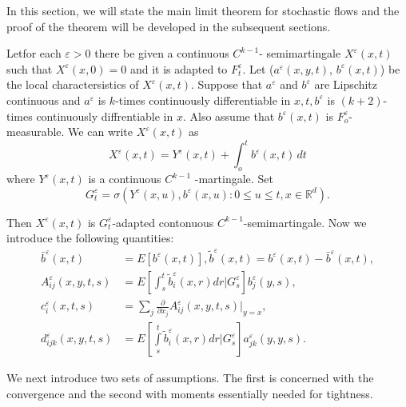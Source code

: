  In this section, we will state the main  limit theorem for stochastic
 flows and the proof of the theorem will be developed in the
 subsequent sections. 
  
 Let\pageoriginale for each $\varepsilon > 0$ there be given a continuous $C^{k-1}$-
 semimartingale $X^\varepsilon(x,t)$ such that $X^\varepsilon (x,0)=0$
 and it is adapted to $F^\varepsilon_t$. Let ($a^\varepsilon
 (x,y,t)$, $b^\varepsilon(x,t)$) be the local charactersistics of
 $X^\varepsilon (x,t)$. Suppose that $a^\varepsilon$ and
 $b^\varepsilon$ are Lipschitz continuous and $a^\varepsilon$ is
 $k$-times continuously differentiable in $x,t,b^\varepsilon$ is
 $(k+2)$- times continuously diffrentiable in $x$. Also assume that
 $b^\varepsilon (x,t)$ is $F^\varepsilon_o$- measurable. We can write
 $X^\varepsilon (x,t)$ as  
 \begin{equation*} 
   X^\varepsilon (x,t) = Y^\varepsilon(x,t) + \int_o^t b^\varepsilon
   (x,t) \, dt \tag{3.3.1}\label{c3:eq3.3.1}  
 \end{equation*} 
 where $Y^\varepsilon (x,t)$ is a continuous $C^{k-1}$ -martingale. Set
 $$
 G^\varepsilon_t= \sigma(Y^\varepsilon(x, u), b^\varepsilon (x,u): 0 
 \le u \le t, x \in \mathbb{R}^d). 
 $$
  
 Then $X^\varepsilon (x,t)$ is $G_t^\varepsilon$-adapted contonuous
 $C^{k-1}$-semimartingale. Now we introduce the following quantities: 
 \begin{align*}
   \bar{b}^\varepsilon (x,t) & = E[b^\varepsilon (x,t)],
   \tilde{b}^\varepsilon (x,t) = b^\varepsilon (x,t) -
   \bar{b}^\varepsilon (x,t),\\ 
   A^\varepsilon_{ij}(x,y,t,s) &= E \left[ \int^t_s \tilde{b}_i^\varepsilon
     (x,r) dr |G^\varepsilon_s \right] b^\varepsilon_j (y,s),\\ 
   c_i^\varepsilon (x,t,s) &= \sum_{j} \frac{\partial}{\partial x_j}
   A^\varepsilon_{ij} (x,y,t,s)|_{y=x} ,\\ 
   d^\varepsilon_{ijk}(x,y,t,s) &= E \left[ \int\limits_s^t
     \tilde{b}^\varepsilon_i (x,r) dr| G^\varepsilon_s
   \right]a^\varepsilon_{jk}(y,y,s). 
 \end{align*} 
  
 We next introduce two sets of assumptions. The first is concerned
 with the convergence and the second with  moments 
 essentially needed for tightness.
  
